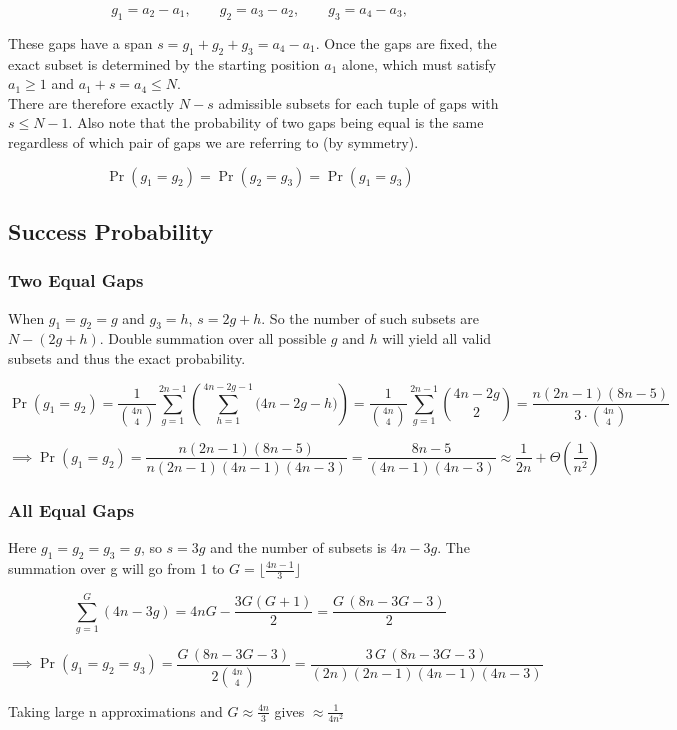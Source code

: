 \[
  g_1=a_2-a_1,\qquad g_2=a_3-a_2,\qquad g_3=a_4-a_3,
\]

These gaps have a span $s=g_1+g_2+g_3=a_4-a_1$. Once the gaps are 
fixed, the exact subset is determined by the starting position $a_1$ alone, which
must satisfy $a_1\ge 1$ and $a_1+s=a_4\le N$.\\

\noindent There are therefore exactly
$N-s$ admissible subsets for each tuple of gaps with $s\le N-1$. Also note that the probability of 
two gaps being equal is the same regardless of which pair of gaps we are referring to (by symmetry).

\[
  \Pr(g_1=g_2)=\Pr(g_2=g_3)=\Pr(g_1=g_3)
\]

\subsection{Success Probability}
\subsubsection*{Two Equal Gaps}
When $g_1=g_2=g$ and $g_3=h$, $s=2g+h$. So the number of such subsets are $N-(2g+h)$. Double 
summation over all possible $g$ and $h$ will yield all valid subsets and thus the exact probability.

\[
  \Pr(g_1=g_2)
  =
  \frac{1}{\binom{4n}{4}}\sum_{g=1}^{2n-1}\left(\sum_{h=1}^{4n-2g-1}\bigl(4n-2g-h\bigr)\right)
  =
  \frac{1}{\binom{4n}{4}}\sum_{g=1}^{2n-1}\binom{4n-2g}{2}
  =
  \frac{n(2n-1)(8n-5)}{3\cdot\binom{4n}{4}}
\]

\vspace{1em}
\[
\implies
\Pr(g_1=g_2)
=
\frac{n(2n-1)(8n-5)}{n(2n-1)(4n-1)(4n-3)}
=
\frac{8n-5}{(4n-1)(4n-3)}
\approx 
\frac{1}{2n} + \Theta(\frac{1}{n^2})
\]

\subsubsection*{All Equal Gaps}
Here $g_1=g_2=g_3=g$, so $s=3g$ and the number of subsets is $4n-3g$. The summation over g will 
go from 1 to $G=\bigl\lfloor\tfrac{4n-1}{3}\bigr\rfloor$

\[
  \sum_{g=1}^{G}(4n-3g)
  =4nG-\frac{3G(G+1)}{2}
  =\frac{G\,(8n-3G-3)}{2}
\]

\[
\implies
  \Pr(g_1=g_2=g_3)
  =\frac{G\,(8n-3G-3)}{2\binom{4n}{4}}
  =\frac{3\,G\,(8n-3G-3)}{(2n)(2n-1)(4n-1)(4n-3)}
\]

\vspace{1em}
\noindent Taking large n approximations and $G \approx \frac{4n}{3}$ gives $\approx \frac{1}{4n^2}$


